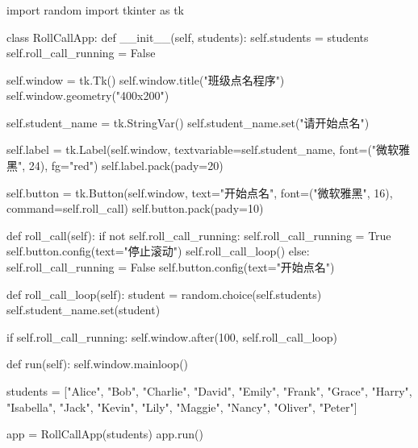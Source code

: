 \begin{frame}[fragile]  
  \frametitle{}  
\begin{codeblock}[firstline=16, lastline =30, firstnumber=16]{}
  import random
  import tkinter as tk
  
  
  class RollCallApp:
      def __init__(self, students):
          self.students = students
          self.roll_call_running = False
  
          self.window = tk.Tk()
          self.window.title("班级点名程序")
          self.window.geometry("400x200")
  
          self.student_name = tk.StringVar()
          self.student_name.set("请开始点名")
  
          self.label = tk.Label(self.window, textvariable=self.student_name, font=("微软雅黑", 24), fg="red")
          self.label.pack(pady=20)
  
          self.button = tk.Button(self.window, text="开始点名", font=("微软雅黑", 16),  command=self.roll_call)
          self.button.pack(pady=10)
  
      def roll_call(self):
          if not self.roll_call_running:
              self.roll_call_running = True
              self.button.config(text="停止滚动")
              self.roll_call_loop()
          else:
              self.roll_call_running = False
              self.button.config(text="开始点名")
  
      def roll_call_loop(self):
          student = random.choice(self.students)
          self.student_name.set(student)
  
          if self.roll_call_running:
              self.window.after(100, self.roll_call_loop)
  
      def run(self):
          self.window.mainloop()
  
  
  students = ["Alice", "Bob", "Charlie", "David", "Emily", "Frank", "Grace", "Harry", "Isabella", "Jack", "Kevin", "Lily", "Maggie", "Nancy", "Oliver", "Peter"]
  
  app = RollCallApp(students)
  app.run()

\end{codeblock}
\end{frame}


